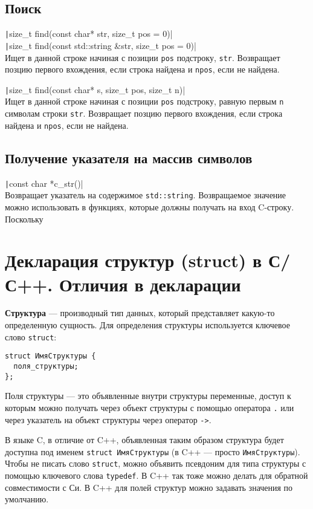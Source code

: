 \subsection{Поиск}
\texttt|size_t find(const char* str, size_t pos = 0)|\\
\texttt|size_t find(const std::string &str, size_t pos = 0)|\\
Ищет в данной строке начиная с позиции \verb|pos| подстроку, \verb|str|.
Возвращает позцию первого вхождения, если строка найдена и \verb|npos|, если не найдена.

\texttt|size_t find(const char* s, size_t pos, size_t n)|\\
Ищет в данной строке начиная с позиции \verb|pos| подстроку, равную первым \verb|n| символам строки \verb|str|.
Возвращает позцию первого вхождения, если строка найдена и \verb|npos|, если не найдена.

\subsection{Получение указателя на массив символов}
\texttt|const char *c_str()|\\
Возвращает указатель на содержимое \verb|std::string|. Возвращаемое значение можно использовать в функциях,
которые должны получать на вход C-строку. Поскольку 

\section{Декларация структур (struct) в С/С++. Отличия в декларации}
\textbf{Структура} \label{def:struct} --- производный тип данных, который представляет какую-то определенную сущность.
Для определения структуры используется ключевое слово \verb|struct|:
\begin{verbatim}
struct ИмяСтруктуры {
  поля_структуры;
};
\end{verbatim}
Поля структуры --- это объявленные внутри структуры переменные, доступ к которым можно получать через объект структуры
с помощью оператора \verb|.| или через указатель на объект структуры через оператор \verb|->|.

В языке C, в отличие от C++, объявленная таким образом структура будет доступна под именем
\verb|struct ИмяСтруктуры| (в C++ --- просто \verb|ИмяСтруктуры|). Чтобы не писать слово
\verb|struct|, можно объявить псевдоним для типа структуры с помощью ключевого слова
\verb|typedef|. В C++ так тоже можно делать для обратной совместимости с Си. В C++
для полей структур можно задавать значения по умолчанию.

